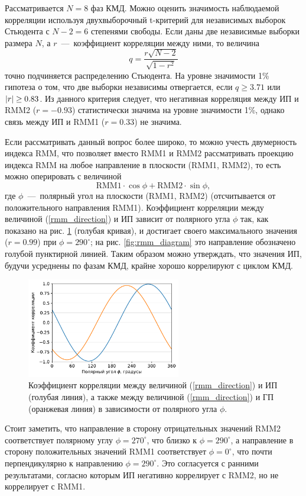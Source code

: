 Рассматривается $N = 8$ фаз КМД. Можно оценить значимость наблюдаемой корреляции используя двухвыборочный t-критерий для независимых выборок Стьюдента с $N - 2 = 6$ степенями свободы. Если даны две независимые выборки размера $N$, а $r$~---~коэффициент корреляции между ними, то величина
\begin{equation}
 	q = \dfrac{r\sqrt{N-2}}{\sqrt{1-r^2}}
\end{equation}
точно подчиняется распределению Стьюдента. На уровне значимости 1\% гипотеза о том, что две выборки независимы отвергается, если $q\ge3.71$ или $\abs{r}\ge0.83$. Из данного критерия следует, что негативная корреляция между ИП и RMM2 ($r=-0.93$) статистически значима на уровне значимости 1\%, однако связь между ИП и RMM1 ($r=0.33$) не значима.

Если рассматривать данный вопрос более широко, то можно учесть двумерность индекса RMM, что позволяет вместо RMM1 и RMM2 рассматривать проекцию индекса RMM на любое направление в плоскости (RMM1, RMM2), то есть можно оперировать с величиной 
\begin{equation}\label{rmm_direction}
	\mathrm{RMM1}\cdot \cos\phi + \mathrm{RMM2}\cdot \sin\phi,
\end{equation}
где $\phi$~---~полярный угол на плоскости (RMM1, RMM2) (отсчитывается от положительного направления RMM1). Коэффициент корреляции между величиной (\ref{rmm_direction}) и ИП зависит от полярного угла $\phi$ так, как показано на рис. \ref{fig:r} (голубая кривая), и достигает своего максимального значения ($r=0.99$) при $\phi=290^\circ$; на рис. \ref{fig:rmm_diagram} это направление обозначено голубой пунктирной линией. Таким образом можно утверждать, что значения ИП, будучи усреднены по фазам КМД, крайне хорошо коррелируют с циклом КМД.

\begin{figure}[htbp]
	\centering
	\includegraphics[width=0.6\textwidth]{figures/r.pdf}
	\caption{Коэффициент корреляции между величиной (\ref{rmm_direction}) и ИП (голубая линия), а также между величиной (\ref{rmm_direction}) и ГП (оранжевая линия) в зависимости от полярного угла $\phi$.}
	\label{fig:r}
\end{figure}

Стоит заметить, что направление в сторону отрицательных значений RMM2 соответствует полярному углу $\phi=270^\circ$, что близко к $\phi=290^\circ$, а направление в сторону положительных значений RMM1 соответствует $\phi=0^\circ$, что почти перпендикулярно к направлению $\phi=290^\circ$. Это согласуется с ранними результатами, согласно которым ИП негативно коррелирует с RMM2, но не коррелирует с RMM1.
